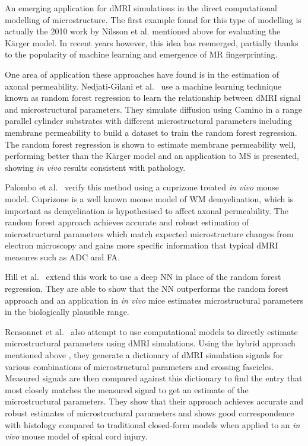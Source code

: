 An emerging application for \ac{dMRI} simulations in the direct computational modelling of microstructure.
The first example found for this type of modelling is actually the 2010 work by Nilsson et al. \cite{Nilsson2010} mentioned above for evaluating the K\"arger model.
In recent years however, this idea has reemerged, partially thanks to the popularity of machine learning and emergence of MR fingerprinting.

One area of application these approaches have found is in the estimation of axonal permeability. Nedjati-Gilani et al.\ \cite{Nedjati-Gilani2017} use a machine learning technique known as random forest regression to learn the relationship between \ac{dMRI} signal and microstructural parameters. They simulate diffusion using Camino in a range parallel cylinder substrates with different microstructural parameters including membrane permeability to build a dataset to train the random forest regression.
The random forest regression is shown to estimate membrane permeability well, performing better than the K\"arger model and an application to \ac{MS} is presented, showing \emph{in vivo} results consistent with pathology.

Palombo et al.\ \cite{Palombo2018a} verify this method using a cuprizone treated \emph{in vivo} mouse model. Cuprizone is a well known mouse model of \ac{WM} demyelination, which is important as demyelination is hypothesised to affect axonal permeability.
The random forest approach achieves accurate and robust estimation of microstructural parameters which match expected microstructure changes from electron microscopy and gains more specific information that typical \ac{dMRI} measures such as \ac{ADC} and \ac{FA}. 

Hill et al.\ \cite{Hill2019} extend this work to use a deep \ac{NN} in place of the random forest regression. They are able to show that the \ac{NN} outperforms the random forest approach and an application in \emph{in vivo} mice estimates microstructural parameters in the biologically plausible range.

Rensonnet et al.\ \cite{Rensonnet2018} also attempt to use computational models to directly estimate microstructural parameters using \ac{dMRI} simulations.
Using the hybrid approach mentioned above \cite{Rensonnet2015}, they generate a dictionary of \ac{dMRI} simulation signals for various combinations of microstructural parameters and crossing fascicles.
Measured signals are then compared against this dictionary to find the entry that most closely matches the measured signal to get an estimate of the microstructural parameters.
They show that their approach achieves accurate and robust estimates of microstructural parameters and shows good correspondence with histology compared to traditional closed-form models when applied to an \emph{in vivo} mouse model of spinal cord injury. 

